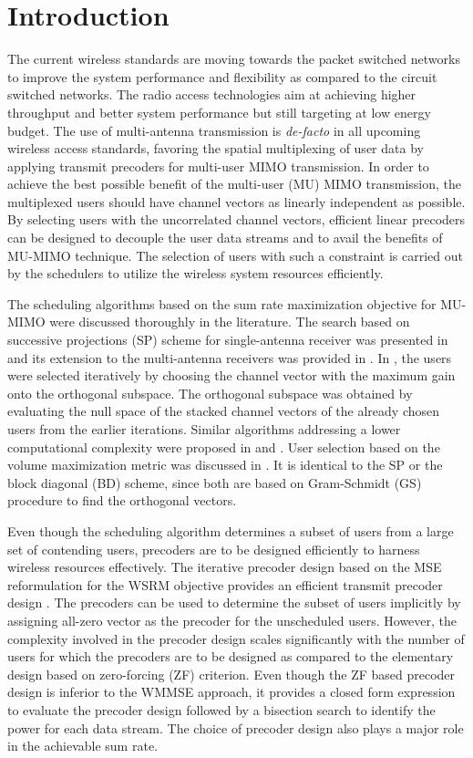 \documentclass[conference,letterpaper]{./../../IEEE/IEEEtran}
\begin{document}
\section{Introduction}
The current wireless standards are moving towards the packet switched networks to improve the system performance and flexibility as compared to the circuit switched networks. The radio access technologies aim at achieving higher throughput and better system performance but still targeting at low energy budget. The use of multi-antenna transmission is \textit{de-facto} in all upcoming wireless access standards, favoring the spatial multiplexing of user data by applying transmit precoders for multi-user \ac{MIMO} transmission. In order to achieve the best possible benefit of the multi-user (MU) \ac{MIMO} transmission, the multiplexed users should have channel vectors as linearly independent as possible. By selecting users with the uncorrelated channel vectors, efficient linear precoders can be designed to decouple the user data streams and to avail the benefits of MU-MIMO technique. The selection of users with such a constraint is carried out by the schedulers to utilize the wireless system resources efficiently.

The scheduling algorithms based on the sum rate maximization objective for MU-MIMO were discussed thoroughly in the literature. The search based on successive projections (SP) scheme for single-antenna receiver was presented in \cite{sus2006zfbf} and its extension to the multi-antenna receivers was provided in \cite{Tolli-etal-2005}. In \cite{Tolli-etal-2005}, the users were selected iteratively by choosing the channel vector with the maximum gain onto the orthogonal subspace. The orthogonal subspace was obtained by evaluating the null space of the stacked channel vectors of the already chosen users from the earlier iterations. Similar algorithms addressing a lower computational complexity were proposed in \cite{shen2006low} and \cite{youtuan2007improved}. User selection based on the volume maximization metric was discussed in \cite{jin2010novel}. It is identical to the SP or the block diagonal (BD) scheme, since both are based on Gram-Schmidt (GS) procedure to find the orthogonal vectors.

Even though the scheduling algorithm determines a subset of users from a large set of contending users, precoders are to be designed efficiently to harness wireless resources effectively. The iterative precoder design based on the \ac{MSE} reformulation for the \ac{WSRM} objective provides an efficient transmit precoder design \cite{wmmse_shi}. The precoders can be used to determine the subset of users implicitly by assigning all-zero vector as the precoder for the unscheduled users. However, the complexity involved in the precoder design scales significantly with the number of users for which the precoders are to be designed as compared to the elementary design based on zero-forcing (ZF) criterion. Even though the ZF based precoder design is inferior to the \ac{WMMSE} approach, it provides a closed form expression to evaluate the precoder design followed by a bisection search to identify the power for each data stream. The choice of precoder design also plays a major role in the achievable sum rate.
\end{document}
